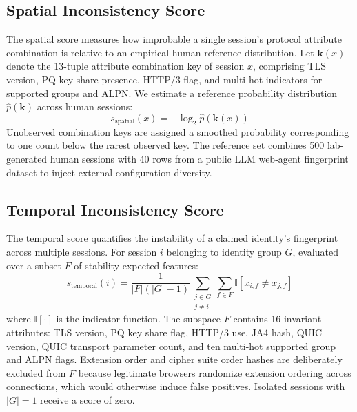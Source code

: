 \documentclass[conference]{IEEEtran}
\begin{document}
\subsection{Spatial Inconsistency Score}
The spatial score measures how improbable a single session's protocol attribute combination is relative to an empirical human reference distribution. Let $\mathbf{k}(x)$ denote the 13-tuple attribute combination key of session $x$, comprising TLS version, PQ key share presence, HTTP/3 flag, and multi-hot indicators for supported groups and ALPN. We estimate a reference probability distribution $\hat{p}(\mathbf{k})$ across human sessions:
\begin{equation}
s_{\text{spatial}}(x) = -\log_2 \hat{p}(\mathbf{k}(x))
\label{eq:spatial}
\end{equation}
Unobserved combination keys are assigned a smoothed probability corresponding to one count below the rarest observed key. The reference set combines 500 lab-generated human sessions with 40 rows from a public LLM web-agent fingerprint dataset \cite{llm_bot_study2026} to inject external configuration diversity.

\subsection{Temporal Inconsistency Score}
The temporal score quantifies the instability of a claimed identity's fingerprint across multiple sessions. For session $i$ belonging to identity group $G$, evaluated over a subset $F$ of stability-expected features:
\begin{equation}
s_{\text{temporal}}(i) = \frac{1}{|F|(|G|-1)} \sum_{\substack{j \in G \\ j \neq i}} \sum_{f \in F} \mathbb{I}[x_{i,f} \neq x_{j,f}]
\label{eq:temporal}
\end{equation}
where $\mathbb{I}[\cdot]$ is the indicator function. The subspace $F$ contains 16 invariant attributes: TLS version, PQ key share flag, HTTP/3 use, JA4 hash, QUIC version, QUIC transport parameter count, and ten multi-hot supported group and ALPN flags. Extension order and cipher suite order hashes are deliberately excluded from $F$ because legitimate browsers randomize extension ordering across connections, which would otherwise induce false positives. Isolated sessions with $|G|=1$ receive a score of zero.
\end{document}
